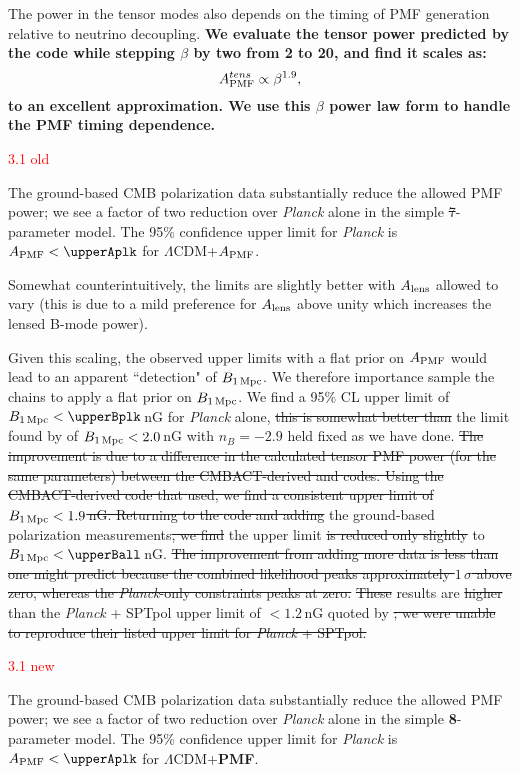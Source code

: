\documentclass{article}
\newcommand{\apmf}{\ensuremath{A_{\rm PMF}}}
\newcommand{\bpmf}{\ensuremath{B_{\rm 1\,Mpc}}}
\newcommand{\alens}{\ensuremath{A_{\rm lens}}}
\newcommand{\lcdm}{\ensuremath{\Lambda}CDM}
\newcommand{\be}{\begin{equation}}
\newcommand{\ee}{\end{equation}}
\newcommand{\planck}{{\sl Planck}}
\newcommand{\sptpol}{SPTpol}
\newcommand{\changed}[1]{\textcolor{Red}{#1}}
\newcommand{\removed}[1]{\st{#1}}
\newcommand{\added}[1]{\textbf{#1}}
\begin{document}
The power in the tensor modes also depends on the timing of PMF generation relative to neutrino decoupling. 
\added{We evaluate the tensor power predicted by the \citet{zucca16} code while stepping $\beta$ by two from 2 to 20, and find it scales as:
\be \label{eqn:betascaling}
\apmf^{tens} \propto \beta^{1.9},
\ee
to an excellent approximation. 
We use this $\beta$ power law form to handle the PMF timing dependence. }

\changed{3.1 old}

The ground-based CMB polarization data  substantially reduce the allowed PMF power; we see a factor of two reduction over \planck{} alone in the simple \removed{7}-parameter model. 
The 95\% confidence upper limit for \planck{} is $\apmf <  \upperAplk$ for \lcdm{}+\apmf{}.

Somewhat counterintuitively, the limits are slightly better with \alens{} allowed to vary (this is due to a mild preference for \alens{} above unity which increases the lensed B-mode power). 

Given this scaling, the observed upper limits with a flat prior on \apmf{} would lead to an apparent ``detection" of \bpmf. 
We therefore importance sample the chains to apply a flat prior on \bpmf. 
We find a 95\% CL upper limit of $\bpmf < \upperBplk$\,nG for \planck{} alone,
\removed{this is somewhat better than} the limit found by \citet{planck15-19} of $\bpmf < 2.0$\,nG with $n_B=-2.9$ held fixed as we have done. 
\removed{The improvement is due to a difference in the calculated tensor PMF power (for the same parameters) between the CMBACT-derived and \citet{zucca16} codes. 
Using the CMBACT-derived code that \citet{planck15-19} used, we find a consistent upper limit of $\bpmf < 1.9$\,nG. 
Returning to the  \citet{zucca16} code and adding} the ground-based polarization measurements\removed{, we find} the upper limit \removed{is  reduced only slightly} to $\bpmf < \upperBall$\,nG. 
\removed{The improvement from adding more data is less than one might predict because the combined likelihood peaks approximately $1\,\sigma$ above zero, whereas the \planck{}-only constraints peaks at zero. }
\removed{These} results are \removed{higher} than the \planck{} + \sptpol{} upper limit of $<1.2\,$nG quoted by \citet{zucca16}\removed{; we were unable to reproduce their listed upper limit for \planck{} + \sptpol{}.}

\changed{3.1 new}

The ground-based CMB polarization data  substantially reduce the allowed PMF power; we see a factor of two reduction over \planck{} alone in the simple \added{8}-parameter model. 
The 95\% confidence upper limit for \planck{} is $\apmf <  \upperAplk$ for \lcdm{}+\added{PMF}. 
\end{document}
